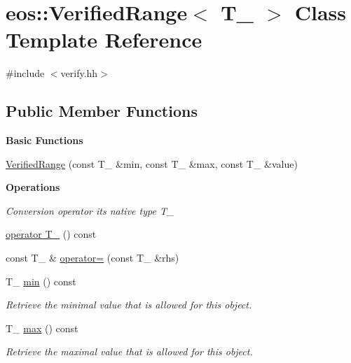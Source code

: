 \hypertarget{classeos_1_1VerifiedRange}{
\section{eos::VerifiedRange$<$ T\_\- $>$ Class Template Reference}
\label{classeos_1_1VerifiedRange}
}


{\ttfamily \#include $<$verify.hh$>$}\subsection*{Public Member Functions}
\begin{Indent}{\bf Basic Functions}\par
{\em \label{_amgrp2386c9a1f1785edee33f374dd2db9b3d}
 }\begin{DoxyCompactItemize}
\item 
\hyperlink{classeos_1_1VerifiedRange_a91cf1ba06903af03ec4100c370330cb7}{VerifiedRange} (const T\_\- \&min, const T\_\- \&max, const T\_\- \&value)
\end{DoxyCompactItemize}
\end{Indent}
\begin{Indent}{\bf Operations}\par
{\em \label{_amgrp456d0deba6a86c9585590550c797502d}
 Conversion operator its native type T\_\- }\begin{DoxyCompactItemize}
\item 
\hyperlink{classeos_1_1VerifiedRange_aee4661f7688177fd52164d7413f9968d}{operator T\_\-} () const 
\item 
const T\_\- \& \hyperlink{classeos_1_1VerifiedRange_af7df09e39360f49d269afffd8a2634be}{operator=} (const T\_\- \&rhs)
\item 
T\_\- \hyperlink{classeos_1_1VerifiedRange_ac2ac9a7194ece299633bfef72fb08378}{min} () const 
\begin{DoxyCompactList}\small\item\em Retrieve the minimal value that is allowed for this object. \item\end{DoxyCompactList}\item 
T\_\- \hyperlink{classeos_1_1VerifiedRange_a19b21c28c1afa78ce4fc83bd9cf8f866}{max} () const 
\begin{DoxyCompactList}\small\item\em Retrieve the maximal value that is allowed for this object. \item\end{DoxyCompactList}\end{DoxyCompactItemize}
\end{Indent}


